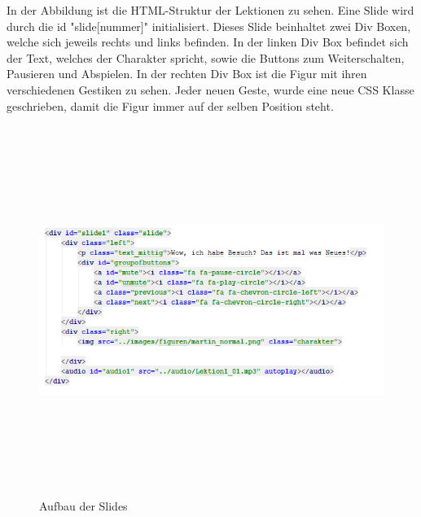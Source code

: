 In der Abbildung ist die HTML-Struktur der Lektionen zu sehen. Eine Slide wird durch die id "slide[nummer]" initialisiert. Dieses Slide beinhaltet zwei Div Boxen, welche sich jeweils rechts und links befinden. In der linken Div Box befindet sich der Text, welches der Charakter spricht, sowie die Buttons zum Weiterschalten, Pausieren und Abspielen. In der rechten Div Box ist die Figur mit ihren verschiedenen Gestiken zu sehen. Jeder neuen Geste, wurde eine neue CSS Klasse geschrieben, damit die Figur immer auf der selben Position steht.
\begin{figure}[H]
	\centering
\includegraphics[width=12cm,height=12cm,keepaspectratio]{webseite_abb10} 
	\caption{Aufbau der Slides}
\end{figure}

